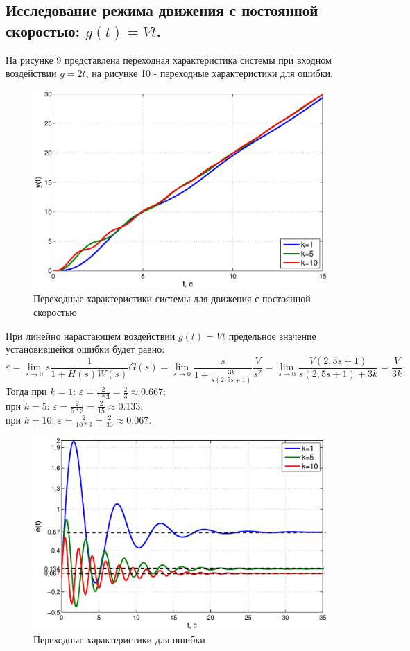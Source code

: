 \documentclass[12pt,a4paper]{article}
\begin{document}
\subsection{Исследование режима движения с постоянной скоростью: $g(t)=Vt$.} 
На рисунке 9 представлена переходная характеристика системы при входном воздействии $g=2t$, на рисунке 10  - переходные характеристики для ошибки.
\begin{figure}[H]
	\centering
	\includegraphics[width=1\linewidth]{2.2.1.eps}
	\caption{Переходные характеристики системы для движения с постоянной скоростью}
\end{figure}
При линейно нарастающем воздействии $g(t)=Vt$ предельное значение установившейся ошибки будет равно:
\begin{equation}
    \varepsilon = \lim_{s\to 0}s\frac{1}{1+H(s)W(s)}G(s) = \lim_{s\to 0}\frac{s}{1 + \displaystyle{\frac{3k}{s(2,5s+1)}}}\frac{V}{s^2} = \lim_{s\to0} \frac{V(2,5s+1)}{s(2,5s+1)+3k}= \frac{V}{3k}.
\end{equation}
Тогда при $k=1$: $\varepsilon = \displaystyle{\frac{2}{1*3} = \frac{2}{3} \approx  0.667;}$\\
при $k=5$: $\varepsilon = \displaystyle{\frac{2}{5*3} = \frac{2}{15} \approx  0.133;}$\\
при $k=10$: $\varepsilon = \displaystyle{\frac{2}{10*3} = \frac{2}{30} \approx  0.067.}$
\begin{figure}[H]
	\centering
	\includegraphics[width=0.95\linewidth]{2.2.2.eps}
	\caption{Переходные характеристики для ошибки}
\end{figure}
\end{document}
